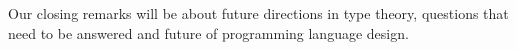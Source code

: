Our closing remarks will be about future directions in type theory, questions that need to be answered and future of programming language design.










